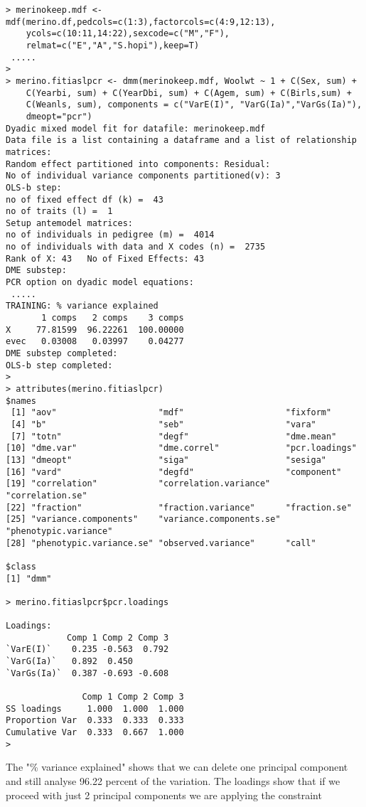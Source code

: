 \documentclass[titlepage]{article}  %
\begin{document}
\begin{verbatim}
> merinokeep.mdf <- mdf(merino.df,pedcols=c(1:3),factorcols=c(4:9,12:13),
    ycols=c(10:11,14:22),sexcode=c("M","F"),
    relmat=c("E","A","S.hopi"),keep=T)
 .....
>
> merino.fitiaslpcr <- dmm(merinokeep.mdf, Woolwt ~ 1 + C(Sex, sum) +
    C(Yearbi, sum) + C(YearDbi, sum) + C(Agem, sum) + C(Birls,sum) +
    C(Weanls, sum), components = c("VarE(I)", "VarG(Ia)","VarGs(Ia)"),
    dmeopt="pcr")
Dyadic mixed model fit for datafile: merinokeep.mdf  
Data file is a list containing a dataframe and a list of relationship matrices:
Random effect partitioned into components: Residual:
No of individual variance components partitioned(v): 3 
OLS-b step:
no of fixed effect df (k) =  43 
no of traits (l) =  1 
Setup antemodel matrices:
no of individuals in pedigree (m) =  4014 
no of individuals with data and X codes (n) =  2735 
Rank of X: 43   No of Fixed Effects: 43 
DME substep:
PCR option on dyadic model equations:
 .....
TRAINING: % variance explained
       1 comps   2 comps    3 comps
X     77.81599  96.22261  100.00000
evec   0.03008   0.03997    0.04277
DME substep completed:
OLS-b step completed:
>
> attributes(merino.fitiaslpcr)
$names
 [1] "aov"                    "mdf"                    "fixform"               
 [4] "b"                      "seb"                    "vara"                  
 [7] "totn"                   "degf"                   "dme.mean"              
[10] "dme.var"                "dme.correl"             "pcr.loadings"
[13] "dmeopt"                 "siga"                   "sesiga"                
[16] "vard"                   "degfd"                  "component"             
[19] "correlation"            "correlation.variance"   "correlation.se"        
[22] "fraction"               "fraction.variance"      "fraction.se"           
[25] "variance.components"    "variance.components.se" "phenotypic.variance"   
[28] "phenotypic.variance.se" "observed.variance"      "call"                  

$class
[1] "dmm"

> merino.fitiaslpcr$pcr.loadings

Loadings:
            Comp 1 Comp 2 Comp 3
`VarE(I)`    0.235 -0.563  0.792
`VarG(Ia)`   0.892  0.450       
`VarGs(Ia)`  0.387 -0.693 -0.608

               Comp 1 Comp 2 Comp 3
SS loadings     1.000  1.000  1.000
Proportion Var  0.333  0.333  0.333
Cumulative Var  0.333  0.667  1.000
> 
\end{verbatim}

The "\% variance explained" shows that we can delete one principal component and still analyse 96.22 percent of the variation.  The loadings show that if we proceed with just 2 principal components we are applying the constraint
\end{document}
